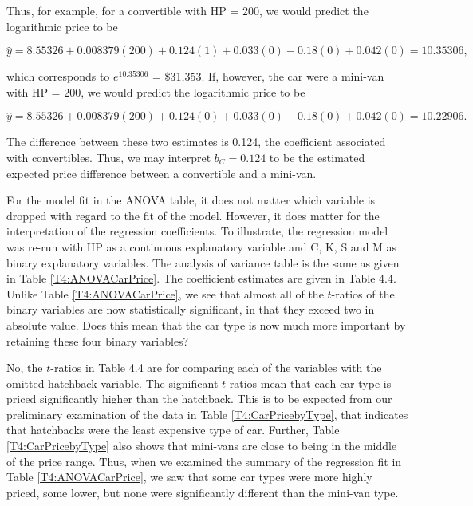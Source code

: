 Thus, for example, for a convertible with HP = 200, we would predict
the logarithmic price to be

\begin{equation*}
\widehat{y}%
=8.55326+0.008379(200)+0.124(1)+0.033(0)-0.18(0)+0.042(0)=10.35306,
\end{equation*}

\noindent which corresponds to $e^{10.35306}$ = \$31,353. If,
however, the car were a mini-van with HP = 200, we would predict the
logarithmic price to be

\begin{equation*}
\widehat{y}%
=8.55326+0.008379(200)+0.124(0)+0.033(0)-0.18(0)+0.042(0)=10.22906.
\end{equation*}

\noindent The difference between these two estimates is 0.124, the
coefficient associated with convertibles. Thus, we may interpret
$b_{C}=0.124$ to be the estimated expected price difference between
a convertible and a mini-van.

For the model fit in the ANOVA table, it does not matter which
variable is dropped with regard to the fit of the model. However, it
does matter for the interpretation of the regression coefficients.
To illustrate, the regression model was re-run with HP as a
continuous explanatory variable and C, K, S and M as binary
explanatory variables. The analysis of variance table is the same as
given in Table \ref{T4:ANOVACarPrice}. The coefficient estimates are
given in Table 4.4. Unlike Table \ref{T4:ANOVACarPrice}, we see that
almost all of the $t$-ratios of the binary variables are now
statistically significant, in that they exceed two in absolute
value. Does this mean that the car type is now much more important
by retaining these four  binary  variables?

No, the $t$-ratios in Table 4.4 are for comparing each of the
variables with the omitted hatchback variable. The significant
$t$-ratios mean that each car type is priced significantly higher
than the hatchback. This is to be expected from our preliminary
examination of the data in Table \ref{T4:CarPricebyType}, that
indicates that hatchbacks were the least expensive type of car.
Further, Table \ref{T4:CarPricebyType} also shows that mini-vans are
close to being in the middle of the price range. Thus, when we
examined the summary of the regression fit in Table
\ref{T4:ANOVACarPrice}, we saw that some car types were more highly
priced, some lower, but none were significantly different than the
mini-van type.

